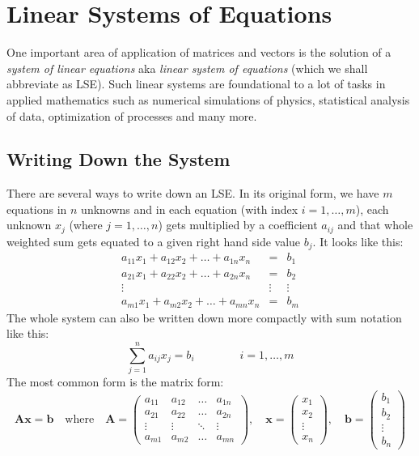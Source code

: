 \section{Linear Systems of Equations}
One important area of application of matrices and vectors is the solution of a \emph{system of linear equations} aka \emph{linear system of equations} (which we shall abbreviate as LSE). Such linear systems are foundational to a lot of tasks in applied mathematics such as numerical simulations of physics, statistical analysis of data, optimization of processes and many more. 

\subsection{Writing Down the System}
There are several ways to write down an LSE. In its original form, we have  $m$ equations in $n$ unknowns and in each equation (with index $i = 1,\ldots, m$), each unknown $x_j$ (where $j=1,\ldots,n$) gets multiplied by a coefficient $a_{ij}$ and that whole weighted sum gets equated to a given right hand side value $b_j$. It looks like this:
\begin{eqnarray}
a_{11} x_1 + a_{12} x_2 + \ldots + a_{1n} x_n &=& b_1    \\
a_{21} x_1 + a_{22} x_2 + \ldots + a_{2n} x_n &=& b_2    \\
                                       \vdots &\vdots& \vdots \\
a_{m1} x_1 + a_{m2} x_2 + \ldots + a_{mn} x_n &=& b_m 
\end{eqnarray}
The whole system can also be written down more compactly with sum notation like this:
\begin{equation}
\sum_{j=1}^n a_{ij} x_j = b_i \qquad \qquad i=1, \ldots, m
\end{equation}
The most common form is the matrix form:
\begin{equation}
\mathbf{A x} = \mathbf{b} \quad \text{where} \quad
\mathbf{A} = 
\begin{pmatrix}
a_{11} & a_{12} & \ldots & a_{1n} \\
a_{21} & a_{22} & \ldots & a_{2n} \\ 
\vdots & \vdots & \ddots & \vdots \\
a_{m1} & a_{m2} & \ldots & a_{mn} 
\end{pmatrix}, \quad
\mathbf{x} = 
\begin{pmatrix}
x_{1} \\
x_{2} \\ 
\vdots\\
x_{n} 
\end{pmatrix}, \quad
\mathbf{b} = 
\begin{pmatrix}
b_{1} \\
b_{2} \\ 
\vdots\\
b_{n} 
\end{pmatrix}
\end{equation}
